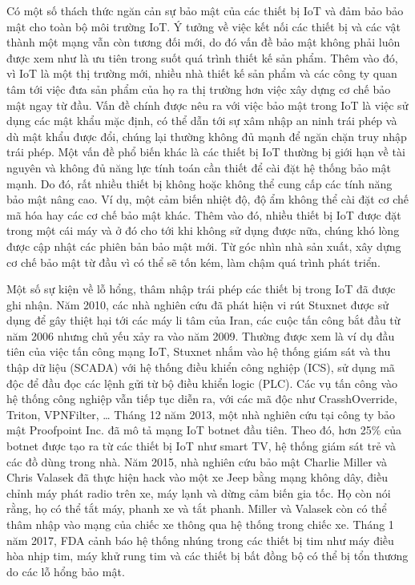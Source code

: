 Có một số thách thức ngăn cản sự bảo mật của các thiết bị IoT và đảm bảo bảo mật cho toàn bộ môi trường IoT. Ý tưởng về việc kết nối các thiết bị và các vật thành một mạng vẫn còn tương đối mới, do đó vấn đề bảo mật không phải luôn được xem như là ưu tiên trong suốt quá trình thiết kế sản phẩm. Thêm vào đó, vì IoT là một thị trường mới, nhiều nhà thiết kế sản phẩm và các công ty quan tâm tới việc đưa sản phẩm của họ ra thị trường hơn việc xây dựng cơ chế bảo mật ngay từ đầu. Vấn đề chính được nêu ra với việc bảo mật trong IoT là việc sử dụng các mật khẩu mặc định, có thể dẫn tới sự xâm nhập an ninh trái phép và dù mật khẩu được đổi, chúng lại thường không đủ mạnh để ngăn chặn truy nhập trái phép. Một vấn đề phổ biến khác là các thiết bị IoT thường bị giới hạn về tài nguyên và không đủ năng lực tính toán cần thiết để cài đặt hệ thống bảo mật mạnh. Do đó, rất nhiều thiết bị không hoặc không thể cung cấp các tính năng bảo mật nâng cao. Ví dụ, một cảm biến nhiệt độ, độ ẩm không thể cài đặt cơ chế mã hóa hay các cơ chế bảo mật khác. Thêm vào đó, nhiều thiết bị IoT được đặt trong một cái máy và ở đó cho tới khi không sử dụng được nữa, chúng khó lòng được cập nhật các phiên bản bảo mật mới. Từ góc nhìn nhà sản xuất, xây dựng cơ chế bảo mật từ đầu vì có thể sẽ tốn kém, làm chậm quá trình phát triển.

Một số sự kiện về lỗ hổng, thâm nhập trái phép các thiết bị trong IoT đã được ghi nhận. Năm 2010, các nhà nghiên cứu đã phát hiện vi rút Stuxnet được sử dụng để gây thiệt hại tới các máy li tâm của Iran, các cuộc tấn công bắt đầu từ năm 2006 nhưng chủ yếu xảy ra vào năm 2009. Thường được xem là ví dụ đầu tiên của việc tấn công mạng IoT, Stuxnet nhắm vào hệ thống giám sát và thu thập dữ liệu (SCADA) với hệ thống điều khiển công nghiệp (ICS), sử dụng mã độc để đầu đọc các lệnh gửi từ bộ điều khiển logic (PLC). Các vụ tấn công vào hệ thống công nghiệp vẫn tiếp tục diễn ra, với các mã độc như CrasshOverride, Triton, VPNFilter, …
Tháng 12 năm 2013, một nhà nghiên cứu tại công ty bảo mật Proofpoint Inc. đã mô tả mạng IoT botnet đầu tiên. Theo đó, hơn 25\% của botnet được tạo ra từ các thiết bị IoT như smart TV, hệ thống giám sát trẻ và các đồ dùng trong nhà. Năm 2015, nhà nghiên cứu bảo mật Charlie Miller và Chris Valasek đã thực hiện hack vào một xe Jeep bằng mạng không dây, điều chỉnh máy phát radio trên xe, máy lạnh và dừng cảm biến gia tốc. Họ còn nói rằng, họ có thể tắt máy, phanh xe và tắt phanh. Miller và Valasek còn có thể thâm nhập vào mạng của chiếc xe thông qua hệ thống trong chiếc xe. 
Tháng 1 năm 2017, FDA cảnh báo hệ thống nhúng trong các thiết bị tim như máy điều hòa nhịp tim, máy khử rung tim và các thiết bị bất đồng bộ có thể bị tổn thương do các lỗ hổng bảo mật.

